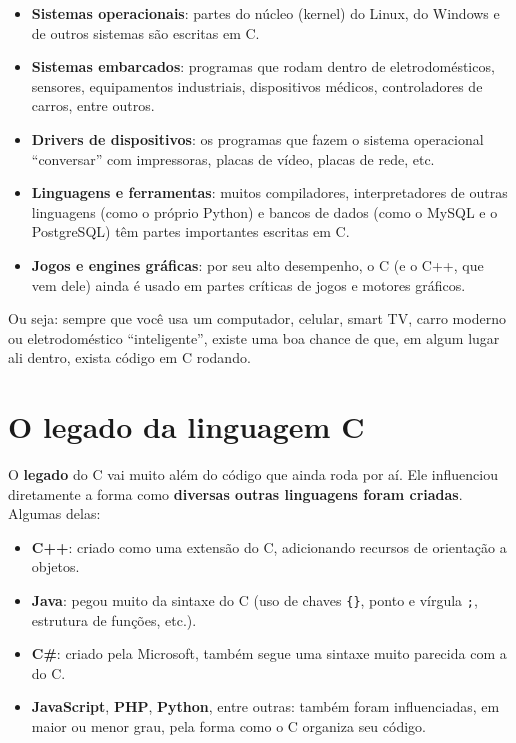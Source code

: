 \begin{dica}
\begin{itemize}
    \item \textbf{Sistemas operacionais}: partes do núcleo (kernel) do Linux, do Windows e de outros sistemas são escritas em C.
    \item \textbf{Sistemas embarcados}: programas que rodam dentro de eletrodomésticos, sensores, equipamentos industriais, dispositivos médicos, controladores de carros, entre outros.
    \item \textbf{Drivers de dispositivos}: os programas que fazem o sistema operacional ``conversar'' com impressoras, placas de vídeo, placas de rede, etc.
    \item \textbf{Linguagens e ferramentas}: muitos compiladores, interpretadores de outras linguagens (como o próprio Python) e bancos de dados (como o MySQL e o PostgreSQL) têm partes importantes escritas em C.
    \item \textbf{Jogos e engines gráficas}: por seu alto desempenho, o C (e o C++, que vem dele) ainda é usado em partes críticas de jogos e motores gráficos.
\end{itemize}
\end{dica}

Ou seja: sempre que você usa um computador, celular, smart TV, carro moderno ou eletrodoméstico ``inteligente'', existe uma boa chance de que, em algum lugar ali dentro, exista código em C rodando.

\section{\textcolor{azulPrincipal}{O legado da linguagem C}}

O \textbf{legado} do C vai muito além do código que ainda roda por aí. Ele influenciou diretamente a forma como \textbf{diversas outras linguagens foram criadas}. Algumas delas:

\begin{itemize}
    \item \textbf{C++}: criado como uma extensão do C, adicionando recursos de orientação a objetos.
    \item \textbf{Java}: pegou muito da sintaxe do C (uso de chaves \texttt{\{\}}, ponto e vírgula \texttt{;}, estrutura de funções, etc.).
    \item \textbf{C\#}: criado pela Microsoft, também segue uma sintaxe muito parecida com a do C.
    \item \textbf{JavaScript}, \textbf{PHP}, \textbf{Python}, entre outras: também foram influenciadas, em maior ou menor grau, pela forma como o C organiza seu código.
\end{itemize}

